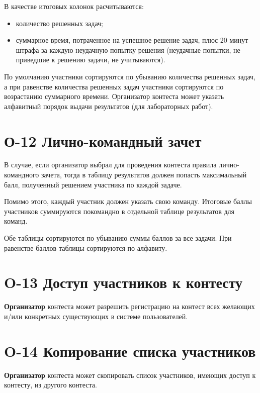 \documentclass{book}
\newcommand{\newcard}[1]{\newpage \section*{#1}}
\begin{document}
	В качестве итоговых колонок расчитываются:
	\begin{itemize}
		\item количество решенных задач;
		\item суммарное время, потраченное на успешное решение задач, плюс 20 минут штрафа за каждую неудачную попытку решения (неудачные попытки, не приведшие к решению задачи, не учитываются).
	\end{itemize} 
	
	По умолчанию участники сортируются по убыванию количества решенных задач, а при равенстве количества решенных задач участники сортируются по возрастанию суммарного времени. Организатор контеста может указать алфавитный порядок выдачи результатов (для лабораторных работ).


\newcard{О-12 Лично-командный зачет}
	В случае, если организатор выбрал для проведения контеста правила лично-командного зачета, тогда в таблицу результатов должен попасть максимальный балл, полученный решением участника по каждой задаче.

	Помимо этого, каждый участник должен указать свою команду. Итоговые баллы участников суммируются покомандно в отдельной таблице результатов для команд.

	Обе таблицы сортируются по убыванию суммы баллов за все задачи. При равенстве баллов таблицы сортируются по алфавиту.

\newcard{O-13 Доступ участников к контесту}
	\textbf{Организатор} контеста может разрешить регистрацию на контест всех желающих и/или конкретных существующих в системе пользователей.

\newcard{O-14 Копирование списка участников}
	\textbf{Организатор} контеста может скопировать список участников, имеющих доступ к контесту, из другого контеста.
\end{document}

